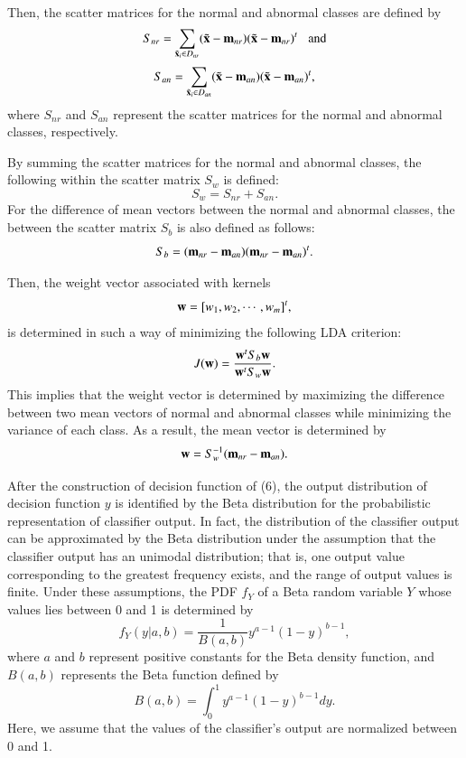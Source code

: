 \documentclass[times,twocolumn,final,authoryear]{elsarticle}
\begin{document}
Then, the scatter matrices for the normal and abnormal classes are defined by
\[
S_{nr} = \sum_{\tilde{\bf x}_i\in D_{nr}}(\tilde{\bf x}-{\bf m}_{nr})(\tilde{\bf x}-{\bf m}_{nr})^t \; \; \; \mbox{and}
\]
\[
S_{an} = \sum_{\tilde{\bf x}_i\in D_{an}}(\tilde{\bf x}-{\bf m}_{an})(\tilde{\bf x}-{\bf m}_{an})^t,
\]
where $S_{nr}$ and $S_{an}$ represent the scatter matrices for the normal and abnormal classes, respectively.

By summing the scatter matrices for the normal and abnormal classes, the following within the scatter matrix $S_{w}$ is defined:
\[
S_{w} = S_{nr} + S_{an}.
\]
For the difference of mean vectors between the normal and abnormal classes, the between the scatter matrix $S_b$ is also defined as follows:
\[
S_{b} = ({\bf m}_{nr} - {\bf m}_{an})({\bf m}_{nr} - {\bf m}_{an})^t.
\]

Then, the weight vector associated with kernels
\begin{equation}
{\bf w} = [w_1, w_2, \cdots, w_m]^t,
\end{equation}
is determined in such a way of minimizing the following LDA criterion:
\begin{equation}
J({\bf w})={{{\bf w}^tS_b{\bf w}}\over{{\bf w}^tS_w{\bf w}}}.
\end{equation}
This implies that the weight vector is determined by maximizing the difference between two mean vectors of normal and abnormal classes while
minimizing the variance of each class. As a result, the mean vector is determined by
\begin{equation}
{\bf w} = S_w^{-1}({\bf m}_{nr} - {\bf m}_{an}). \label{w}
\end{equation}

After the construction of decision function of (6), the output distribution of decision function $y$ is identified by the Beta distribution for the probabilistic representation of classifier output. In fact, the distribution of the classifier output can be approximated by the Beta distribution under the assumption that the classifier output has an unimodal distribution; that is, one output value corresponding to the greatest frequency exists, and the range of output values is finite. Under these assumptions, the PDF $f_Y$ of a Beta random variable $Y$ whose values lies between 0 and 1 is determined by
\begin{equation}
f_Y(y|a, b) = \frac{1}{B(a, b)}y^{a-1}(1-y)^{b-1},
\end{equation}
where $a$ and $b$ represent positive constants for the Beta density function, and $B(a, b)$ represents the Beta function defined by
\[
B(a, b) = \int^1_0 y^{a-1}(1-y)^{b-1}dy.
\]
Here, we assume that the values of the classifier's output are normalized between 0 and 1.  
\end{document}
